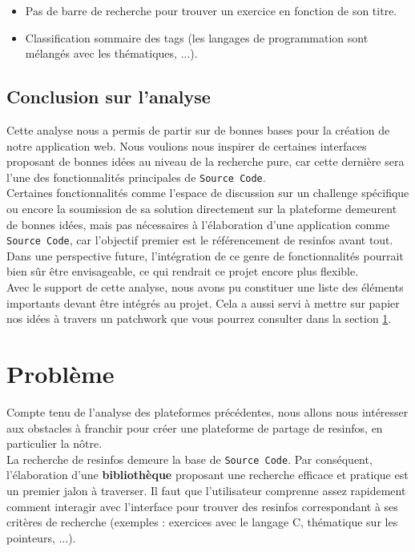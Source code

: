 \begin{itemize}
    \item Pas de barre de recherche pour trouver un exercice en fonction de son titre.
    \item Classification sommaire des \glspl{tag} (les langages de programmation sont mélangés avec les thématiques, ...).
\end{itemize}

\subsection*{Conclusion sur l'analyse}

Cette analyse nous a permis de partir sur de bonnes bases pour la création de notre application web. Nous voulions nous inspirer de certaines interfaces proposant de bonnes idées au niveau de la recherche pure, car cette dernière sera l'une des fonctionnalités principales de \texttt{Source Code}. \\

Certaines fonctionnalités comme l'espace de discussion sur un challenge spécifique ou encore la soumission de sa solution directement sur la plateforme demeurent de bonnes idées, mais pas nécessaires à l'élaboration d'une application comme \texttt{Source Code}, car l'objectif premier est le référencement de \glspl{resinfo} avant tout. Dans une perspective future, l'intégration de ce genre de fonctionnalités pourrait bien sûr être envisageable, ce qui rendrait ce projet encore plus flexible.\\

Avec le support de cette analyse, nous avons pu constituer une liste des éléments importants devant être intégrés au projet. Cela a aussi servi à mettre sur papier nos idées à travers un patchwork que vous pourrez consulter dans la section \ref{section:problem}.


\section{Problème}
\label{section:problem}

Compte tenu de l'analyse des plateformes précédentes, nous allons nous intéresser aux obstacles à franchir pour créer une plateforme de partage de \glspl{resinfo}, en particulier la nôtre.\\

La recherche de \glspl{resinfo} demeure la base de \texttt{Source Code}. Par conséquent, l'élaboration d'une \textbf{bibliothèque} proposant une recherche efficace et pratique est un premier jalon à traverser. Il faut que l'utilisateur comprenne assez rapidement comment interagir avec l'interface pour trouver des \glspl{resinfo} correspondant à ses critères de recherche (exemples : exercices avec le langage C, thématique sur les pointeurs, ...).\\

